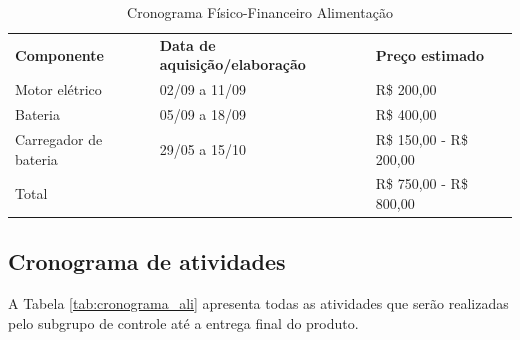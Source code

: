 \begin{table}[]
\centering
 \caption{Cronograma Físico-Financeiro Alimentação} \label{tab:custo_alimentacao}
\begin{tabular}{lll}
{\color[HTML]{000000} \textbf{Componente}} & {\color[HTML]{000000} \textbf{Data de aquisição/elaboração}} & {\color[HTML]{000000} \textbf{Preço estimado}} \\
Motor elétrico                             & 02/09 a 11/09                                                & R\$ 200,00                                     \\
Bateria                                    & 05/09 a 18/09                                                & R\$ 400,00                                     \\
Carregador de bateria                      & 29/05 a 15/10                                                & R\$ 150,00 - R\$ 200,00                          \\
Total                                      &                                                              & R\$ 750,00 - R\$ 800,00                         
\end{tabular}
\end{table}

\subsection{Cronograma de atividades}
A Tabela \ref{tab:cronograma_ali} apresenta todas as atividades que serão realizadas pelo subgrupo de controle até a entrega final do produto.

